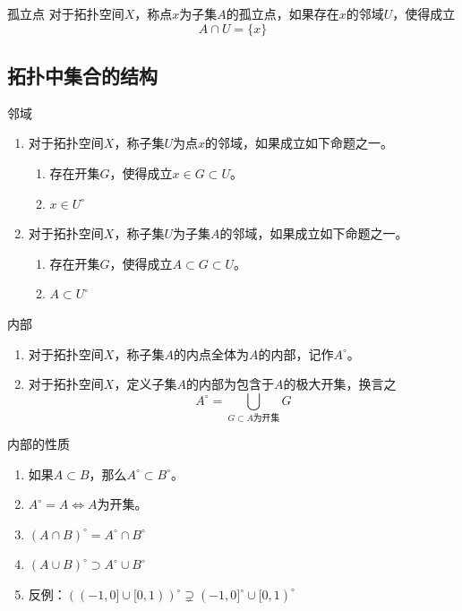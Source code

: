 \documentclass[lang = cn, scheme = chinese, thmcnt = section, usesamecnt]{elegantbook}
\newcommand{\sub}{\subset}             %
\begin{document}
\begin{definition}{孤立点}
	对于拓扑空间$X$，称点$x$为子集$A$的孤立点，如果存在$x$的邻域$U$，使得成立%
	$$
	A\cap U=\{ x \}
	$$
\end{definition}

\subsection{拓扑中集合的结构}

\begin{definition}{邻域}
	\begin{enumerate}
		\item 对于拓扑空间$X$，称子集$U$为点$x$的邻域，如果成立如下命题之一。
		\begin{enumerate}
			\item 存在开集$G$，使得成立$x\in G\sub U$。
			\item $x\in U^\circ$
		\end{enumerate}
		\item 对于拓扑空间$X$，称子集$U$为子集$A$的邻域，如果成立如下命题之一。
		\begin{enumerate}
			\item 存在开集$G$，使得成立$A\sub G\sub U$。
			\item $A\sub U^\circ$
		\end{enumerate}
	\end{enumerate}
\end{definition}

\begin{definition}{内部}
	\begin{enumerate}
		\item 对于拓扑空间$X$，称子集$A$的内点全体为$A$的内部，记作$A^\circ$。
		\item 对于拓扑空间$X$，定义子集$A$的内部为包含于$A$的极大开集，换言之%
		$$
		A^\circ=\bigcup_{G\sub A\text{为开集}}G
		$$
	\end{enumerate}
\end{definition}

\begin{proposition}{内部的性质}
	\begin{enumerate}
		\item 如果$A\sub B$，那么$A^\circ\sub B^\circ$。
		\item $A^\circ=A\iff A$为开集。
		\item $(A\cap B)^\circ=A^\circ\cap B^\circ$
		\item $(A\cup B)^\circ \supset A^\circ\cup B^\circ$
		\item 反例：$((-1,0]\cup[0,1))^\circ\supsetneq (-1,0]^\circ\cup[0,1)^\circ$
	\end{enumerate}
\end{proposition}
\end{document}
